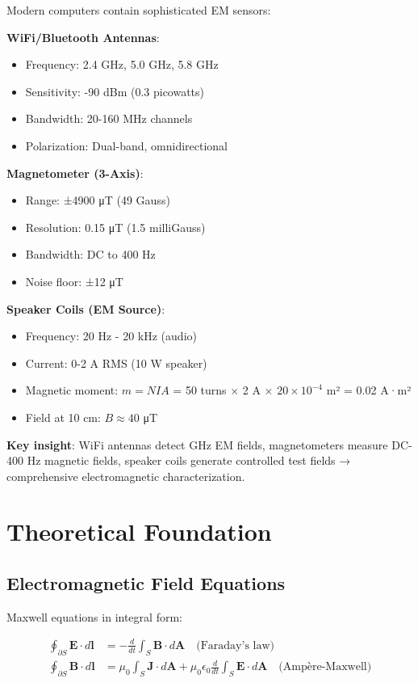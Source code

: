 \documentclass[12pt,a4paper]{article}
\begin{document}
Modern computers contain sophisticated EM sensors:

\textbf{WiFi/Bluetooth Antennas}:
\begin{itemize}
\item Frequency: 2.4 GHz, 5.0 GHz, 5.8 GHz
\item Sensitivity: -90 dBm (0.3 picowatts)
\item Bandwidth: 20-160 MHz channels
\item Polarization: Dual-band, omnidirectional
\end{itemize}

\textbf{Magnetometer (3-Axis)}:
\begin{itemize}
\item Range: ±4900 μT (49 Gauss)
\item Resolution: 0.15 μT (1.5 milliGauss)
\item Bandwidth: DC to 400 Hz
\item Noise floor: ±12 μT
\end{itemize}

\textbf{Speaker Coils (EM Source)}:
\begin{itemize}
\item Frequency: 20 Hz - 20 kHz (audio)
\item Current: 0-2 A RMS (10 W speaker)
\item Magnetic moment: $m = NIA$ = 50 turns × 2 A × $20 \times 10^{-4}$ m² = 0.02 A·m²
\item Field at 10 cm: $B \approx 40$ μT
\end{itemize}

\textbf{Key insight}: WiFi antennas detect GHz EM fields, magnetometers measure DC-400 Hz magnetic fields, speaker coils generate controlled test fields → comprehensive electromagnetic characterization.

\section{Theoretical Foundation}

\subsection{Electromagnetic Field Equations}

Maxwell equations in integral form:

\begin{align}
\oint_{\partial S} \mathbf{E} \cdot d\mathbf{l} &= -\frac{d}{dt}\int_S \mathbf{B} \cdot d\mathbf{A} \quad \text{(Faraday's law)} \\
\oint_{\partial S} \mathbf{B} \cdot d\mathbf{l} &= \mu_0 \int_S \mathbf{J} \cdot d\mathbf{A} + \mu_0\epsilon_0 \frac{d}{dt}\int_S \mathbf{E} \cdot d\mathbf{A} \quad \text{(Ampère-Maxwell)}
\end{align}
\end{document}
